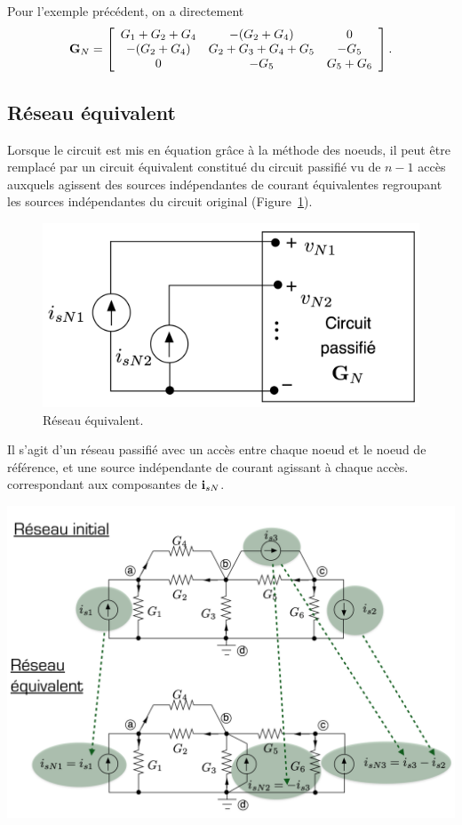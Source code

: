 \begin{testexample}
Pour l'exemple précédent, on a directement 
\[
{\bf G}_N =
\left[ \begin{array}{ccc}
G_1+G_2+G_4 & -(G_2+G_4) & 0 \\
-(G_2+G_4) & G_2+G_3+G_4+G_5 & -G_5\\
0 & -G_5 & G_5+G_6
\end{array} \right]. \]
\end{testexample}

\subsection{Réseau équivalent}
Lorsque le circuit est mis en équation grâce à la méthode des noeuds, il peut être remplacé par un circuit équivalent constitué du
circuit passifié vu de $n-1$ accès auxquels agissent des sources
indépendantes de courant équivalentes regroupant les sources
indépendantes du circuit original (Figure~\ref{fig:reseau_equivalent_MN}).
\begin{figure}[htb]
	\centering
	\includegraphics[width=0.6\linewidth]{figs/methodes-generales/reseau_equivalent_MN}
	\caption{Réseau équivalent.}
	\label{fig:reseau_equivalent_MN}
\end{figure}
Il s'agit d'un réseau passifié avec un accès entre chaque noeud et le noeud de
référence, et une source indépendante de courant agissant à chaque accès. correspondant aux composantes de ${\bf i}_{sN}$.
\begin{testexample}
	\centering
	\includegraphics[width=0.9\linewidth]{figs/methodes-generales/ex_reseau_equivalent_MN}
\end{testexample}

